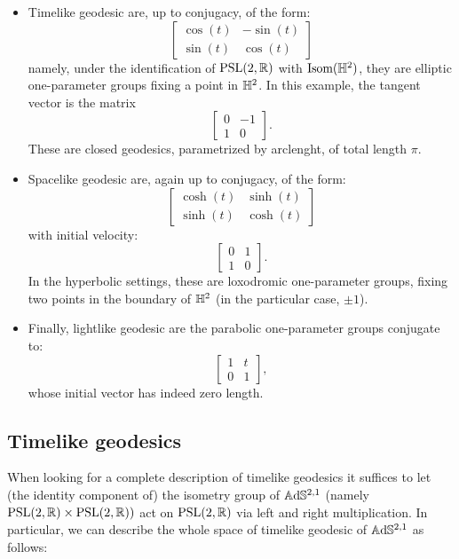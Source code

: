 \begin{itemize}
    \item Timelike geodesic are, up to conjugacy, of the form: 
    \[
    \begin{bmatrix}
    \cos(t) & -\sin(t) \\
    \sin(t) & \cos(t)
     \end{bmatrix}
\]
namely, under the identification of $\text{PSL}(2,\mathbb{R})$ with $\text{Isom}(\mathbb{H}^2)$, they are elliptic one-parameter groups fixing a point in $\mathbb{H}^2$. In this example, the tangent vector is the matrix
\[
    \begin{bmatrix}
    0 & -1 \\
    1 & 0
    \end{bmatrix}.
    \]
These are closed geodesics, parametrized by arclenght, of total length $\pi$. 
\item Spacelike geodesic are, again up to conjugacy, of the form: 
\[
    \begin{bmatrix}
    \cosh(t) & \sinh(t) \\
    \sinh(t) & \cosh(t) \end{bmatrix}
\]
with initial velocity: 
\[
    \begin{bmatrix}
        0 & 1 \\
        1 & 0
    \end{bmatrix}.
\]
In the hyperbolic settings, these are loxodromic one-parameter groups, fixing two points in the boundary of $\mathbb{H}^2$ (in the particular case, $\pm 1$). 
\item Finally, lightlike geodesic are the parabolic one-parameter groups conjugate to: 
\[
    \begin{bmatrix}
        1 & t \\
        0 & 1 
    \end{bmatrix},
\]
whose initial vector has indeed zero length.
\end{itemize}

\subsection{Timelike geodesics}
When looking for a complete description of timelike geodesics it suffices to let (the identity component of) the isometry group of $\mathbb{A}\mathrm{d}\mathbb{S}^{2,1}$ (namely $\text{PSL}(2,\mathbb{R})\times\text{PSL}(2,\mathbb{R}))$ act on $\text{PSL}(2,\mathbb{R})$ via left and right multiplication. In particular, we can describe the whole space of timelike geodesic of $\mathbb{A}\mathrm{d}\mathbb{S}^{2,1}$ as follows: 

